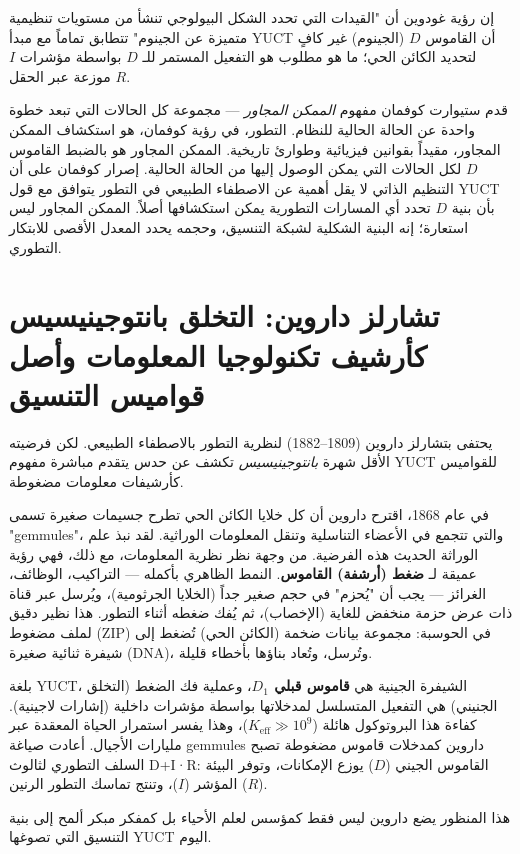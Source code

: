 \documentclass[12pt,a4paper]{article}
\begin{document}
	إن رؤية غودوين أن "القيدات التي تحدد الشكل البيولوجي تنشأ من مستويات تنظيمية متميزة عن الجينوم" تتطابق تماماً مع مبدأ YUCT أن القاموس \(D\) (الجينوم) غير كافٍ لتحديد الكائن الحي؛ ما هو مطلوب هو التفعيل المستمر للـ \(D\) بواسطة مؤشرات \(I\) موزعة عبر الحقل \(R\).
	
	قدم ستيوارت كوفمان مفهوم \emph{الممكن المجاور} — مجموعة كل الحالات التي تبعد خطوة واحدة عن الحالة الحالية للنظام. التطور، في رؤية كوفمان، هو استكشاف الممكن المجاور، مقيداً بقوانين فيزيائية وطوارئ تاريخية. الممكن المجاور هو بالضبط القاموس \(D\) لكل الحالات التي يمكن الوصول إليها من الحالة الحالية. إصرار كوفمان على أن التنظيم الذاتي لا يقل أهمية عن الاصطفاء الطبيعي في التطور يتوافق مع قول YUCT بأن بنية \(D\) تحدد أي المسارات التطورية يمكن استكشافها أصلاً. الممكن المجاور ليس استعارة؛ إنه البنية الشكلية لشبكة التنسيق، وحجمه يحدد المعدل الأقصى للابتكار التطوري.
	
	\section{تشارلز داروين: التخلق بانتوجينيسيس كأرشيف تكنولوجيا المعلومات وأصل قواميس التنسيق}
	
	يحتفى بتشارلز داروين (1809–1882) لنظرية التطور بالاصطفاء الطبيعي. لكن فرضيته الأقل شهرة \emph{بانتوجينيسيس} تكشف عن حدس يتقدم مباشرة مفهوم YUCT للقواميس كأرشيفات معلومات مضغوطة.
	
	في عام 1868، اقترح داروين أن كل خلايا الكائن الحي تطرح جسيمات صغيرة تسمى "gemmules"، والتي تتجمع في الأعضاء التناسلية وتنقل المعلومات الوراثية. لقد نبذ علم الوراثة الحديث هذه الفرضية. من وجهة نظر نظرية المعلومات، مع ذلك، فهي رؤية عميقة لـ \textbf{ضغط (أرشفة) القاموس}. النمط الظاهري بأكمله — التراكيب، الوظائف، الغرائز — يجب أن "يُحزم" في حجم صغير جداً (الخلايا الجرثومية)، ويُرسل عبر قناة ذات عرض حزمة منخفض للغاية (الإخصاب)، ثم يُفك ضغطه أثناء التطور. هذا نظير دقيق لملف مضغوط (ZIP) في الحوسبة: مجموعة بيانات ضخمة (الكائن الحي) تُضغط إلى شيفرة ثنائية صغيرة (DNA)، وتُرسل، وتُعاد بناؤها بأخطاء قليلة.
	
	بلغة YUCT، الشيفرة الجينية هي \textbf{قاموس قبلي \(D_1\)}، وعملية فك الضغط (التخلق الجنيني) هي التفعيل المتسلسل لمدخلاتها بواسطة مؤشرات داخلية (إشارات لاجينية). كفاءة هذا البروتوكول هائلة (\(K_{\mathrm{eff}} \gg 10^9\))، وهذا يفسر استمرار الحياة المعقدة عبر مليارات الأجيال. أعادت صياغة gemmules داروين كمدخلات قاموس مضغوطة تصبح السلف التطوري لثالوث D+I·R: القاموس الجيني (\(D\)) يوزع الإمكانات، وتوفر البيئة المؤشر (\(I\))، وتنتج تماسك التطور الرنين (\(R\)).
	
	هذا المنظور يضع داروين ليس فقط كمؤسس لعلم الأحياء بل كمفكر مبكر ألمح إلى بنية التنسيق التي تصوغها YUCT اليوم.
	
\end{document}
